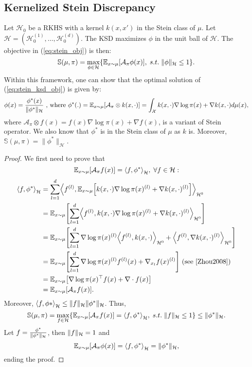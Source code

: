 \documentclass[runningheads,a4paper]{llncs}
\newcommand{\E}{\mathbb{E}}
\newcommand{\Sr}{\mathbb{S}}
\newcommand{\X}{\mathcal{X}}
\newcommand{\A}{\mathcal{A}}
\newcommand{\Hr}{\mathcal{H}}
\DeclarePairedDelimiter{\norm}{\|}{\|}
\DeclarePairedDelimiter{\bra}{\{}{\}}
\DeclarePairedDelimiter{\sq}{[}{]}
\DeclarePairedDelimiter{\sca}{\langle}{\rangle}
\begin{document}
\subsection{Kernelized Stein Discrepancy}\label{sec:ksd}
Let $\Hr_0$ be a RKHS with a kernel $k(x, x')$ in the Stein class of $\mu$.
Let $\Hr = (\Hr^{(1)}_0, \dots, \Hr^{(d)}_0)$. The KSD maximizes $\phi$ in the unit ball of $\Hr$.
The objective in (\ref{eq:stein_obj}) is then:
\begin{equation}
  \Sr(\mu, \pi) =
    \max_{\phi \in \Hr} \bra*{ \E_{x \sim \mu}[\A_\pi \phi (x)], \; s.t. \; \|\phi\|_{\Hr} \leq 1 }.
  \label{eq:stein_ksd_obj}
\end{equation}
Within this framework, one can show that the optimal solution of (\ref{eq:stein_ksd_obj})
is given by:
\begin{equation}
  \phi(x) = \frac{\phi^*(x)}{\|\phi^*\|_{\Hr}}
    \text{ , where } \phi^*(.) = \E_{x \sim \mu}\sq*{ \A_\pi \otimes k(x, \cdot) }
                               = \int_\X k(x, \cdot) \nabla \log \pi(x) + \nabla k(x, \cdot) d\mu(x),
  \label{eq:stein_ksd_sol}        
\end{equation}
where $\A_\pi \otimes f(x) = f(x) \nabla \log \pi(x) + \nabla f(x)$, is a variant of Stein operator.
We also know that $\phi^*$ is in the Stein class of $\mu$ as $k$ is.
Moreover, $\Sr(\mu, \pi) = \|\phi^*\|_\Hr$.
\begin{proof}
  We first need to prove that
  $$
  \E_{x \sim \mu} \sq*{ \A_\pi f(x) } = \sca*{f, \phi^*}_\Hr, \; \forall f \in \Hr:
  $$
  \begin{equation}
    \begin{split}
      \sca*{f, \phi^*}_\Hr &= \sum_{l=1}^d \sca*{ f^{(l)},
        \E_{x \sim \mu}\sq*{ k(x, \cdot) \nabla \log \pi(x)^{(l)} + \nabla k(x, \cdot)^{(l)}} }_{\Hr^0} \\
        &= \E_{x \sim \mu}\sq*{ \sum_{l=1}^d \sca*{f^{(l)}, k(x, \cdot)
          \nabla \log \pi(x)^{(l)} + \nabla k(x, \cdot)^{(l)} }_{\Hr^0} } \\
        &= \E_{x \sim \mu}\sq*{ \sum_{l=1}^d \nabla \log \pi(x)^{(l)}
          \sca*{ f^{(l)}, k(x, \cdot) }_{\Hr^0} + \sca*{ f^{(l)}, \nabla k(x, \cdot)^{(l)} }_{\Hr^0} } \\
        &= \E_{x \sim \mu}\sq*{ \sum_{l=1}^d \nabla \log \pi(x)^{(l)} f^{(l)}(x) + \nabla_{x_l} f(x)^{(l)} }
         \text{ (see \cite{Zhou2008}) } \\
        &= \E_{x \sim \mu}\sq*{ \nabla \log \pi(x)^\top f(x) + \nabla \cdot f(x) } \\
        &= \E_{x \sim \mu} \sq*{ \A_\pi f(x) }.
    \end{split}
  \end{equation}
  Moreover, $\sca*{ f, \phi* }_\Hr \leq \norm{f}_\Hr \norm{\phi^*}_\Hr$.
  Thus,
  $$
  \Sr(\mu, \pi) =
    \max_{f \in \Hr} \bra*{ \E_{x \sim \mu}[\A_\pi f (x)] = \sca*{f, \phi^*}_\Hr, \; s.t. \; \|f\|_{\Hr} \leq 1 }
    \leq \norm{\phi^*}_\Hr.
  $$
  Let $f = \frac{\phi^*}{\norm{\phi^*}_\Hr}$, then $\norm{f}_\Hr = 1$ and
  $$
  \E_{x \sim \mu}[\A_\pi \phi (x)] = \sca*{f, \phi^*}_\Hr = \norm{\phi^*}_\Hr,
  $$
  ending the proof.
\end{proof}
\end{document}

